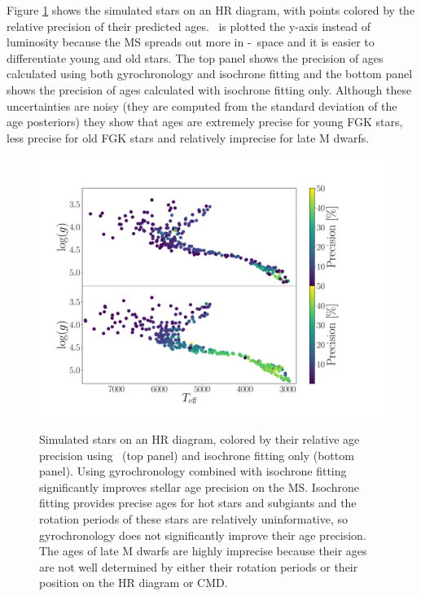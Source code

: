 Figure \ref{fig:precision} shows the simulated stars on an HR diagram, with
points colored by the relative precision of their predicted ages.
\logg\ is plotted the y-axis instead of luminosity because the MS spreads out
more in \teff-\logg\ space and it is easier to differentiate young and old
stars.
The top panel shows the precision of ages calculated using both gyrochronology
and isochrone fitting and the bottom panel shows the precision of ages
calculated with isochrone fitting only.
Although these uncertainties are noisy (they are computed from the standard
deviation of the age posteriors) they show that ages are extremely precise for
young FGK stars, less precise for old FGK stars and relatively imprecise for
late M dwarfs.

\begin{figure}
  \caption{
Simulated stars on an HR diagram, colored by their relative age precision
    using \sd\ (top panel) and isochrone fitting only (bottom panel).
Using gyrochronology combined with isochrone fitting significantly improves
    stellar age precision on the MS.
Isochrone fitting provides precise ages for hot stars and subgiants and the
    rotation periods of these stars are relatively uninformative, so
    gyrochronology does not significantly improve their age precision.
The ages of late M dwarfs are highly imprecise because their ages are not well
    determined by either their rotation periods or their position on the HR
    diagram or CMD.
}
  \centering
    \includegraphics[width=1\textwidth]{precision_plot}
\label{fig:precision}
\end{figure}

